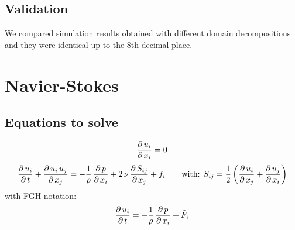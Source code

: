 \documentclass[11pt,a4paper]{article}
\begin{document}
\subsection{Validation}

We compared simulation results obtained with different domain decompositions and
they were identical up to the 8th decimal place.

\section{Navier-Stokes}
\subsection{Equations to solve}
\begin{align}
\frac{\partial \, u_i}{\partial \, x_i}=0
\end{align}
\begin{align}
\frac{\partial \, u_i	}{\partial \, t}+\frac{\partial \, u_i\,u_j}{\partial \, x_j}=-\frac{1}{\rho}\,\frac{\partial \, p}{\partial \, x_i}+2\,\nu\,\frac{\partial \, S_{ij}}{\partial \, x_j}+f_i \qquad
\text{with: }S_{ij}=\frac{1}{2}\left(\frac{\partial \, u_i}{\partial \, x_j}+\frac{\partial \, u_j}{\partial \, x_i}\right)
\end{align}
with FGH-notation:
\begin{align}
\frac{\partial \, u_i	}{\partial \, t}=-\frac{1}{\rho}\,\frac{\partial \, p}{\partial \, x_i}+\tilde F_i
\end{align}
\end{document}
